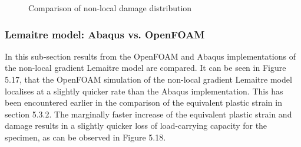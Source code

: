 \documentclass[sn-mathphys,Numbered,draft]{sn-jnl}%
\begin{document}
\begin{figure}[t!]
	\centering
		\qquad
		
		\caption{Comparison of non-local damage distribution}
	\label{label_for_entire_figure}
\end{figure}
\FloatBarrier

\subsubsection{Lemaitre model: Abaqus vs. OpenFOAM}

In this sub-section results from the OpenFOAM and Abaqus implementations of the non-local gradient Lemaitre model are compared. It can be seen in Figure 5.17, that the OpenFOAM simulation of the non-local gradient Lemaitre model localises at a slightly quicker rate than the Abaqus implementation. This has been encountered earlier in the comparison of the equivalent plastic strain in section 5.3.2. The marginally faster increase of the equivalent plastic strain and damage results in a slightly quicker loss of load-carrying capacity for the specimen, as can be observed in Figure 5.18.
\end{document}
